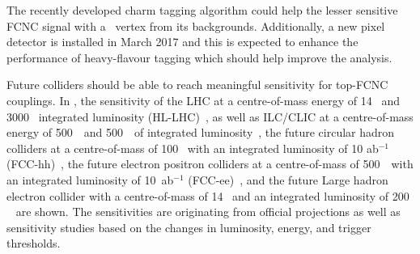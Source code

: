 The recently developed charm tagging algorithm could help the lesser sensitive FCNC signal with a \Zct\ vertex from its backgrounds. Additionally, a new pixel detector is installed in March 2017 and this is expected to enhance the performance of heavy-flavour tagging which should help improve the analysis. 

\newpage
Future colliders should be able to reach meaningful sensitivity for top-FCNC couplings. In , the sensitivity of the LHC at a centre-of-mass energy of 14 \TeV\ and 3000 \fbinv\ integrated luminosity (HL-LHC)~\cite{Agashe:2013hma}, as well as ILC/CLIC at a centre-of-mass energy of 500~\GeV\ and 500~\fbinv\ of integrated luminosity~\cite{Mangano:2016jyj}, the  future circular hadron colliders at a centre-of-mass of 100 \TeV\ with an integrated luminosity of 10 ab$^{-1}$ (FCC-hh)~\cite{Agashe:2013hma}, the future electron positron colliders at a centre-of-mass of 500~\GeV\ with an integrated luminosity of 10~ab$^{-1}$ (FCC-ee)~\cite{Khanpour:2014xla}, and the future Large hadron electron collider with a centre-of-mass of 14 \TeV\ and an integrated luminosity of 200 \fbinv~\cite{Liu:2015kkp} are shown. The sensitivities are originating from official projections as well as sensitivity studies based on the changes in luminosity, energy, and trigger thresholds. 

